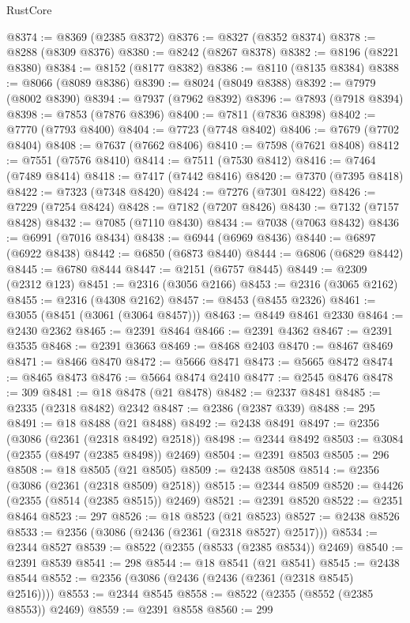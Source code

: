 \begin{lexlean}{RustCore}
\begin{coremodule}
@8374 := @8369 (@2385 @8372)
@8376 := @8327 (@8352 @8374)
@8378 := @8288 (@8309 @8376)
@8380 := @8242 (@8267 @8378)
@8382 := @8196 (@8221 @8380)
@8384 := @8152 (@8177 @8382)
@8386 := @8110 (@8135 @8384)
@8388 := @8066 (@8089 @8386)
@8390 := @8024 (@8049 @8388)
@8392 := @7979 (@8002 @8390)
@8394 := @7937 (@7962 @8392)
@8396 := @7893 (@7918 @8394)
@8398 := @7853 (@7876 @8396)
@8400 := @7811 (@7836 @8398)
@8402 := @7770 (@7793 @8400)
@8404 := @7723 (@7748 @8402)
@8406 := @7679 (@7702 @8404)
@8408 := @7637 (@7662 @8406)
@8410 := @7598 (@7621 @8408)
@8412 := @7551 (@7576 @8410)
@8414 := @7511 (@7530 @8412)
@8416 := @7464 (@7489 @8414)
@8418 := @7417 (@7442 @8416)
@8420 := @7370 (@7395 @8418)
@8422 := @7323 (@7348 @8420)
@8424 := @7276 (@7301 @8422)
@8426 := @7229 (@7254 @8424)
@8428 := @7182 (@7207 @8426)
@8430 := @7132 (@7157 @8428)
@8432 := @7085 (@7110 @8430)
@8434 := @7038 (@7063 @8432)
@8436 := @6991 (@7016 @8434)
@8438 := @6944 (@6969 @8436)
@8440 := @6897 (@6922 @8438)
@8442 := @6850 (@6873 @8440)
@8444 := @6806 (@6829 @8442)
@8445 := @6780 @8444
@8447 := @2151 (@6757 @8445)
@8449 := @2309 (@2312 @123)
@8451 := @2316 (@3056 @2166)
@8453 := @2316 (@3065 @2162)
@8455 := @2316 (@4308 @2162)
@8457 := @8453 (@8455 @2326)
@8461 := @3055 (@8451 (@3061 (@3064 @8457)))
@8463 := @8449 @8461 @2330
@8464 := @2430 @2362
@8465 := @2391 @8464
@8466 := @2391 @4362
@8467 := @2391 @3535
@8468 := @2391 @3663
@8469 := @8468 @2403
@8470 := @8467 @8469
@8471 := @8466 @8470
@8472 := @5666 @8471
@8473 := @5665 @8472
@8474 := @8465 @8473
@8476 := @5664 @8474 @2410
@8477 := @2545 @8476
@8478 := 309
@8481 := @18 @8478 (@21 @8478)
@8482 := @2337 @8481
@8485 := @2335 (@2318 @8482) @2342
@8487 := @2386 (@2387 @339)
@8488 := 295
@8491 := @18 @8488 (@21 @8488)
@8492 := @2438 @8491
@8497 := @2356 (@3086 (@2361 (@2318 @8492) @2518))
@8498 := @2344 @8492
@8503 := @3084 (@2355 (@8497 (@2385 @8498)) @2469)
@8504 := @2391 @8503
@8505 := 296
@8508 := @18 @8505 (@21 @8505)
@8509 := @2438 @8508
@8514 := @2356 (@3086 (@2361 (@2318 @8509) @2518))
@8515 := @2344 @8509
@8520 := @4426 (@2355 (@8514 (@2385 @8515)) @2469)
@8521 := @2391 @8520
@8522 := @2351 @8464
@8523 := 297
@8526 := @18 @8523 (@21 @8523)
@8527 := @2438 @8526
@8533 := @2356 (@3086 (@2436 (@2361 (@2318 @8527) @2517)))
@8534 := @2344 @8527
@8539 := @8522 (@2355 (@8533 (@2385 @8534)) @2469)
@8540 := @2391 @8539
@8541 := 298
@8544 := @18 @8541 (@21 @8541)
@8545 := @2438 @8544
@8552 := @2356 (@3086 (@2436 (@2436 (@2361 (@2318 @8545) @2516))))
@8553 := @2344 @8545
@8558 := @8522 (@2355 (@8552 (@2385 @8553)) @2469)
@8559 := @2391 @8558
@8560 := 299

\end{coremodule}
\end{lexlean}
